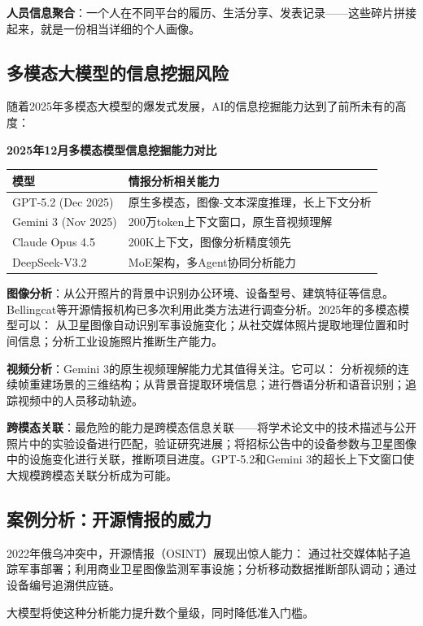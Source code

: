 \textbf{人员信息聚合}：一个人在不同平台的履历、生活分享、发表记录——这些碎片拼接起来，就是一份相当详细的个人画像。

\subsection{多模态大模型的信息挖掘风险}

随着2025年多模态大模型的爆发式发展，AI的信息挖掘能力达到了前所未有的高度：

\textbf{2025年12月多模态模型信息挖掘能力对比}

\small
\begin{tabular}{p{2.5cm}p{9cm}}
\toprule
\textbf{模型} & \textbf{情报分析相关能力} \\
\midrule
GPT-5.2 (Dec 2025) & 原生多模态，图像-文本深度推理，长上下文分析 \\
Gemini 3 (Nov 2025) & 200万token上下文窗口，原生音视频理解 \\
Claude Opus 4.5 & 200K上下文，图像分析精度领先 \\
DeepSeek-V3.2 & MoE架构，多Agent协同分析能力 \\
\bottomrule
\end{tabular}

\textbf{图像分析}：从公开照片的背景中识别办公环境、设备型号、建筑特征等信息。Bellingcat等开源情报机构已多次利用此类方法进行调查分析。2025年的多模态模型可以：
从卫星图像自动识别军事设施变化；从社交媒体照片提取地理位置和时间信息；分析工业设施照片推断生产能力。

\textbf{视频分析}：Gemini 3的原生视频理解能力尤其值得关注。它可以：
分析视频的连续帧重建场景的三维结构；从背景音提取环境信息；进行唇语分析和语音识别；追踪视频中的人员移动轨迹。

\textbf{跨模态关联}：最危险的能力是跨模态信息关联——将学术论文中的技术描述与公开照片中的实验设备进行匹配，验证研究进展；将招标公告中的设备参数与卫星图像中的设施变化进行关联，推断项目进度。GPT-5.2和Gemini 3的超长上下文窗口使大规模跨模态关联分析成为可能。

\subsection{案例分析：开源情报的威力}

2022年俄乌冲突中，开源情报（OSINT）展现出惊人能力：
通过社交媒体帖子追踪军事部署；利用商业卫星图像监测军事设施；分析移动数据推断部队调动；通过设备编号追溯供应链。

大模型将使这种分析能力提升数个量级，同时降低准入门槛。

